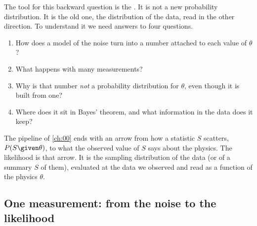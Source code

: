 The tool for this backward question is the . It is not a
new probability distribution. It is the old one, the distribution of the
data, read in the other direction. To understand it we need answers to four
questions.
\begin{enumerate}[label=\arabic*.]
  \item How does a model of the noise turn into a number attached to each
        value of $\theta$?
  \item What happens with many measurements?
  \item Why is that number \emph{not} a probability distribution for
        $\theta$, even though it is built from one?
  \item Where does it sit in Bayes' theorem, and what information in the
        data does it keep?
\end{enumerate}
The pipeline of \cref{ch:00} ends with an arrow from how a statistic $S$
scatters, $P(S\given\theta)$, to what the observed value of $S$ says about
the physics. The likelihood is that arrow. It is the sampling distribution
of the data (or of a summary $S$ of them), evaluated at the data we
observed and read as a function of the physics $\theta$.

\subsection{One measurement: from the noise to the likelihood}
\label{3b:sec:one-measurement}

